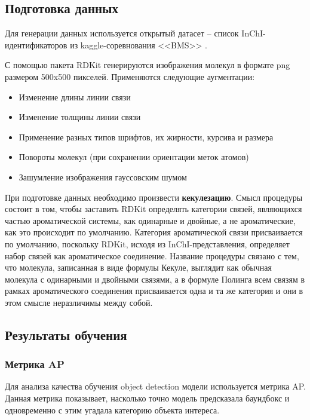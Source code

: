 \subsection{Подготовка данных}

Для генерации данных используется открытый датасет -- список InChI-идентификаторов из kaggle-соревнования <<BMS>> \cite{bms}.

С помощью пакета RDKit \cite{rdkit} генерируются изображения молекул в формате png размером 500x500 пикселей. Применяются следующие аугментации:

\begin{itemize}
	\item Изменение длины линии связи
	\item Изменение толщины линии связи
	\item Применение разных типов шрифтов, их жирности, курсива и размера
	\item Повороты молекул (при сохранении ориентации меток атомов)
	\item Зашумление изображения гауссовским шумом
\end{itemize}

При подготовке данных необходимо произвести \textbf{кекулезацию}. Смысл процедуры состоит в том, чтобы заставить RDKit определять категории связей, являющихся частью ароматической системы, как одинарные и двойные, а не ароматические, как это происходит по умолчанию. Категория ароматической связи присваивается по умолчанию, поскольку RDKit, исходя из InChI-представления, определяет набор связей как ароматическое соединение. Название процедуры связано с тем, что молекула, записанная в виде формулы Кекуле, выглядит как обычная молекула с одинарными и двойными связями, а в формуле Полинга всем связям в рамках ароматического соединения присваивается одна и та же категория и они в этом смысле неразличимы между собой.

\subsection{Результаты обучения}

\subsubsection{Метрика AP}

Для анализа качества обучения object detection модели используется метрика AP. Данная метрика показывает, насколько точно модель предсказала баундбокс и одновременно с этим угадала категорию объекта интереса.

